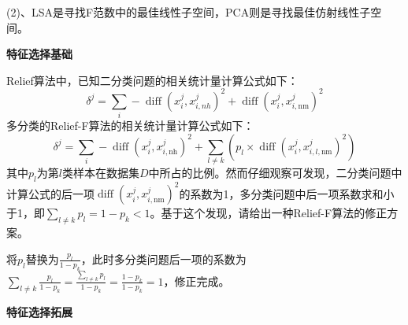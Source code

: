 \documentclass[answers]{exam}  %
\begin{document}
\begin{questions}
\begin{solution}
\begin{parts}
(2)、LSA是寻找F范数中的最佳线性子空间，PCA则是寻找最佳仿射线性子空间。
	\end{parts}
\end{solution}

\question [15] \textbf{特征选择基础}

Relief算法中，已知二分类问题的相关统计量计算公式如下：
\begin{equation} \delta^{j}=\sum_{i}-\operatorname{diff}\left(x_{i}^{j}, x_{i, n h}^{j}\right)^{2}+\operatorname{diff}\left(x_{i}^{j}, x_{i, \mathrm{nm}}^{j}\right)^{2}
\end{equation}
多分类的Relief-F算法的相关统计量计算公式如下：
\begin{equation}
	\delta^{j}=\sum_{i}-\operatorname{diff}\left(x_{i}^{j}, x_{i, \mathrm{nh}}^{j}\right)^{2}+\sum_{l \neq k}\left(p_{l} \times \operatorname{diff}\left(x_{i}^{j}, x_{i, l, \mathrm{nm}}^{j}\right)^{2}\right)
\end{equation}
其中$p_l$为第$l$类样本在数据集$D$中所占的比例。然而仔细观察可发现，二分类问题中计算公式的后一项$\operatorname{diff}\left(x_{i}^{j}, x_{i, \mathrm{nm}}^{j}\right)^{2}$的系数为1，多分类问题中后一项系数求和小于1，即$\sum_{l \neq k}p_l = 1-p_k < 1$。基于这个发现，请给出一种Relief-F算法的修正方案。


\begin{solution}
	将$p_l$替换为$\frac{p_l}{1-p_k}$，此时多分类问题后一项的系数为$\sum\limits_{l\not=k}\frac{p_l}{1-p_k}=\frac{\sum\limits_{l\not=k}p_l}{1-p_k}=\frac{1-p_k}{1-p_k}=1$，修正完成。
\end{solution}

\question [15] \textbf{特征选择拓展}


\end{questions}
\end{document}
